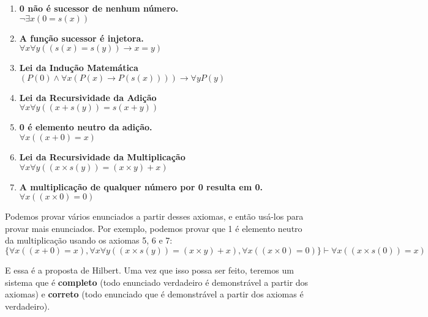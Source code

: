 \begin{enumerate}
    \item \textbf{0 não é sucessor de nenhum número.}
    \\ $\neg\exists x(0 = s(x))$
    \item \textbf{A função sucessor é injetora.}
    \\ $\forall x\forall y((s(x) = s(y)) \rightarrow x = y)$
    \item \textbf{Lei da Indução Matemática}
    \\ $(P(0) \land \forall x(P(x) \rightarrow P(s(x)))) \rightarrow \forall y P(y)$
    \item \textbf{Lei da Recursividade da Adição}
    \\ $\forall x\forall y((x + s(y)) = s(x + y))$
    \item \textbf{0 é elemento neutro da adição.}
    \\ $\forall x((x + 0) = x)$
    \item \textbf{Lei da Recursividade da Multiplicação}
    \\ $\forall x\forall y((x \times s(y)) = (x \times y) + x)$
    \item \textbf{A multiplicação de qualquer número por 0 resulta em 0.}
    \\ $\forall x((x \times 0) = 0)$
\end{enumerate}

Podemos provar vários enunciados a partir desses axiomas, e então usá-los para provar mais enunciados. Por exemplo, podemos provar que 1 é elemento neutro da multiplicação usando os axiomas 5, 6 e 7:
\[\{\forall x((x + 0) = x), \forall x\forall y((x \times s(y)) = (x \times y) + x), \forall x((x \times 0) = 0)\} \vdash \forall x((x \times s(0)) = x)\]

E essa é a proposta de Hilbert. Uma vez que isso possa ser feito, teremos um sistema que é \textbf{completo} (todo enunciado verdadeiro é demonstrável a partir dos axiomas) e \textbf{correto} (todo enunciado que é demonstrável a partir dos axiomas é verdadeiro).